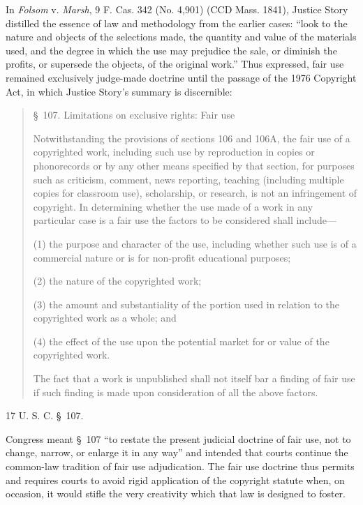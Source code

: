 In \textit{Folsom} v. \textit{Marsh}, 9 F. Cas. 342 (No. 4,901) (CCD Mass.
1841), Justice Story distilled the essence of law and methodology from the
earlier cases: ``look to the nature and objects of the selections made, the
quantity and value of the materials used, and the degree in which the use may
prejudice the sale, or diminish the profits, or supersede the objects, of the
original work.'' Thus expressed, fair use remained
exclusively judge-made doctrine until the passage of the 1976 Copyright Act, in
which Justice Story's summary is discernible:
\begin{quotation}
\noindent \S~107. Limitations on exclusive rights: Fair use

Notwithstanding the provisions of sections 106 and 106A, the
fair use of a copyrighted work, including such use by reproduction in copies or
phonorecords or by any other means specified by that section, for purposes such
as criticism, comment, news reporting, teaching (including multiple copies for
classroom use), scholarship, or research, is not an infringement of copyright.
In determining whether the use made of a work in any particular case is a fair
use the factors to be considered shall include---
\begin{statute}
\item (1) the purpose and character of the use, including whether such use is of
a commercial nature or is for non-profit educational purposes;
\item (2) the nature of the copyrighted work;
\item (3) the amount and substantiality of the portion used in
relation to the copyrighted work as a whole; and
\item (4) the effect of the use upon the potential market for or value of the
copyrighted
work.
\end{statute}
The fact that a work is unpublished shall not
itself bar a finding of fair use if such finding is made upon consideration of
all the above factors.
\end{quotation}
17 U. S. C. \S~107.

Congress meant \S~107 ``to restate the present judicial doctrine of fair use,
not to change, narrow, or enlarge it in any way'' and intended that courts
continue the common-law tradition of fair use adjudication. The fair use
doctrine thus permits and requires courts to avoid rigid application of the
copyright statute when, on occasion, it would stifle the very creativity which
that law is designed to foster.

